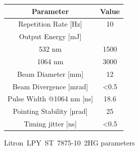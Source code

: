 \documentclass[20pt,margin=1in,innermargin=-4.5in,blockverticalspace=-0.25in]{tikzposter}
\begin{document}
\begin{columns}
{    %
 

    \vspace{1em}

    \begin{center}  

    \begin{threeparttable}
        \centering
        \begin{tabular}{|c | c|} 
        \hline
            \textbf{Parameter} & \textbf{Value} \\ [0.5ex] 
        \hline
        Repetition Rate [Hz] & 10  \\ 
        \hline
            Output Energy [mJ] & \\
            532 nm & 1500 \\
            1064 nm & 3000  \\
        \hline
            Beam Diameter [mm] & 12  \\
        \hline
            Beam Divergence [mrad] & \textless 0.5  \\ 
        \hline
            Pulse Width @1064 nm [ns] & 18.6 \\
        \hline
            Pointing Stability [µrad] & 25  \\
        \hline
            Timing jitter [ns] & \textless 0.5  \\
        \hline
        \end{tabular}

        \caption[Litron~LPY~ST~7875-10~2HG parameters]{Litron~LPY~ST~7875-10~2HG parameters \protect\cite{litronmanual}}
        
       
    \end{threeparttable}

    \label{tab:litronparameters}
    \end{center}
    

}
\end{columns}
\end{document}
